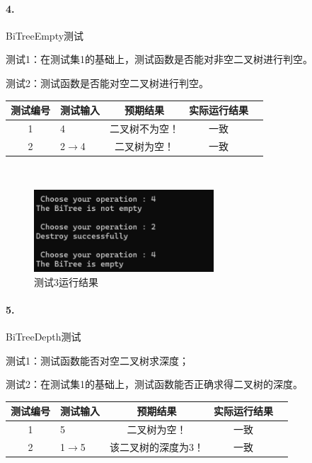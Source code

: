 \documentclass[supercite]{Experimental_Report}
\theoremstyle{definition}
\begin{document}
\paragraph{ 4.}BiTreeEmpty测试

测试1：在测试集1的基础上，测试函数是否能对非空二叉树进行判空。

测试2：测试函数是否能对空二叉树进行判空。

\vspace{0.5em}

\begin{tabular}{|c|l|c|c|c|}
	\hline
	测试编号 & 测试输入 & 预期结果 & 实际运行结果 \\
	\hline
	1 & 4 & 二叉树不为空！ & 一致 \\
	\hline
	2 & 2$\rightarrow$4 & 二叉树为空！ & 一致 \\
	\hline
\end{tabular}

~\

\begin{figure}[H]
 	\centering
 	\includegraphics[width=0.6\textwidth]{images/二叉树测试4.png}
 	\caption{测试3运行结果}
 	\label{txlab}
 \end{figure}

\paragraph{ 5.}BiTreeDepth测试

测试1：测试函数能否对空二叉树求深度；

测试2：在测试集1的基础上，测试函数能否正确求得二叉树的深度。

\vspace{0.5em}

\begin{tabular}{|c|l|c|c|c|}
	\hline
	测试编号 & 测试输入 & 预期结果 & 实际运行结果 \\
	\hline
	1 & 5 & 二叉树为空！ & 一致 \\
	\hline
	2 & 1$\rightarrow$5 & 该二叉树的深度为3！ & 一致 \\
	\hline
\end{tabular}
\end{document}
